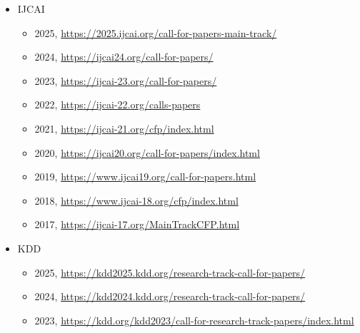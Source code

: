 \begin{itemize}
    \item IJCAI
    \begin{itemize}
        \item 2025, \url{https://2025.ijcai.org/call-for-papers-main-track/} 
        \item 2024, \url{https://ijcai24.org/call-for-papers/}
        \item 2023, \url{https://ijcai-23.org/call-for-papers/}
        \item 2022, \url{https://ijcai-22.org/calls-papers}
        \item 2021, \url{https://ijcai-21.org/cfp/index.html}
        \item 2020, \url{https://ijcai20.org/call-for-papers/index.html}
        \item 2019, \url{https://www.ijcai19.org/call-for-papers.html}
        \item 2018, \url{https://www.ijcai-18.org/cfp/index.html}
        \item 2017, \url{https://ijcai-17.org/MainTrackCFP.html}
    \end{itemize}
    
    \item KDD 
    \begin{itemize}
        \item 2025, \url{https://kdd2025.kdd.org/research-track-call-for-papers/} 
        \item 2024, \url{https://kdd2024.kdd.org/research-track-call-for-papers/}
        \item 2023, \url{https://kdd.org/kdd2023/call-for-research-track-papers/index.html}
    \end{itemize}
\end{itemize}


